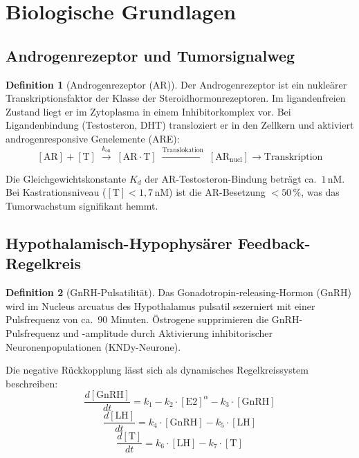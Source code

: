 ﻿\documentclass[a4paper,12pt]{article}
\theoremstyle{definition}
\newtheorem{definition}{Definition}
\begin{document}
\section{Biologische Grundlagen}

\subsection{Androgenrezeptor und Tumorsignalweg}

\begin{definition}[Androgenrezeptor (AR)]
Der Androgenrezeptor ist ein nukleärer Transkriptionsfaktor der Klasse der Steroidhormonrezeptoren.
Im ligandenfreien Zustand liegt er im Zytoplasma in einem Inhibitorkomplex vor.
Bei Ligandenbindung (Testosteron, DHT) transloziert er in den Zellkern und aktiviert androgenresponsive Genelemente (ARE):
\[
  [\mathrm{AR}] + [\mathrm{T}] \;\xrightarrow{k_{\mathrm{on}}}\; [\mathrm{AR} \cdot \mathrm{T}] \;\xrightarrow{\text{Translokation}}\; [\mathrm{AR}_{\mathrm{nucl}}] \xrightarrow{} \text{Transkription}
\]
\end{definition}

Die Gleichgewichtskonstante $K_d$ der AR-Testosteron-Bindung beträgt ca.\ $1\,\text{nM}$.
Bei Kastrationsniveau ($[\mathrm{T}] < 1{,}7\,\text{nM}$) ist die AR-Besetzung $< 50\,\%$, was das Tumorwachstum signifikant hemmt.

\subsection{Hypothalamisch-Hypophysärer Feedback-Regelkreis}

\begin{definition}[GnRH-Pulsatilität]
Das Gonadotropin-releasing-Hormon (GnRH) wird im Nucleus arcuatus des Hypothalamus pulsatil sezerniert mit einer Pulsfrequenz von ca.\ 90 Minuten.
Östrogene supprimieren die GnRH-Pulsfrequenz und -amplitude durch Aktivierung inhibitorischer Neuronenpopulationen (KNDy-Neurone).
\end{definition}

Die negative Rückkopplung lässt sich als dynamisches Regelkreissystem beschreiben:
\begin{equation}
  \frac{d[\mathrm{GnRH}]}{dt} = k_1 - k_2 \cdot [\mathrm{E2}]^{\alpha} - k_3 \cdot [\mathrm{GnRH}]
  \label{eq:gnrh}
\end{equation}
\begin{equation}
  \frac{d[\mathrm{LH}]}{dt} = k_4 \cdot [\mathrm{GnRH}] - k_5 \cdot [\mathrm{LH}]
  \label{eq:lh}
\end{equation}
\begin{equation}
  \frac{d[\mathrm{T}]}{dt} = k_6 \cdot [\mathrm{LH}] - k_7 \cdot [\mathrm{T}]
  \label{eq:testo}
\end{equation}
\end{document}
